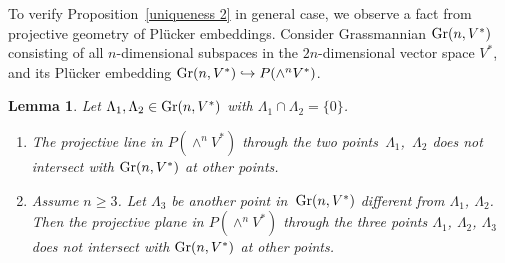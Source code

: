 \documentclass[pdftex]{sigma}
\newtheorem{Lem}[Th]{Lemma}
{ \theoremstyle{definition}
\newtheorem{Def}[Th]{Definition}
\newtheorem{Rem}[Th]{Remark}
\newtheorem{Ex}[Th]{Example}}
\begin{document}
To verify Proposition~\ref{uniqueness 2} in general case,
we observe a fact from projective geometry of Pl\"{u}cker embeddings.
Consider Grassmannian ${\rm Gr}(n, V^*)$ consisting of all
$n$-dimensional subspaces
in the $2n$-dimensional vector space $V^*$, and its
Pl\"{u}cker embedding ${\rm Gr}(n, V^*) \hookrightarrow P(\wedge^{n} V^*)$.

\begin{Lem}
\label{proj.geom}
Let $\Lambda_1, \Lambda_2 \in {\rm Gr}(n, V^*)$ with $\Lambda_1 \cap \Lambda_2 = \{ 0\}$.
\begin{enumerate}\itemsep=0pt
\item[$(1)$] The projective line in $P(\wedge^{n} V^*)$
through the two points~$\Lambda_1$,~$\Lambda_2$ does not intersect
with ${\rm Gr}(n, V^*)$ at other points.

\item[$(2)$] Assume $n \geq 3$. Let $\Lambda_3$ be another point in~${\rm Gr}(n, V^*)$
different from $\Lambda_1$, $\Lambda_2$. Then the projective plane
in $P(\wedge^{n} V^*)$ through the three points $\Lambda_1$, $\Lambda_2$,
$\Lambda_3$
does not intersect with ${\rm Gr}(n, V^*)$ at other points.
\end{enumerate}
\end{Lem}
\end{document}

